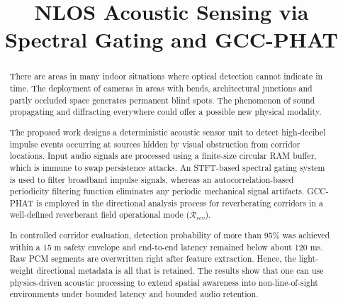 \documentclass[conference]{IEEEtran}
\begin{document}
\title{NLOS Acoustic Sensing via Spectral Gating and GCC-PHAT}

\author{
}

\maketitle

\begin{abstract}
There are areas in many indoor situations where optical detection cannot indicate in time. The deployment of cameras in areas with bends, architectural junctions and partly occluded space generates permanent blind spots. The phenomenon of sound propagating and diffracting everywhere could offer a possible new physical modality.

The proposed work designs a deterministic acoustic sensor unit to detect high-decibel impulse events occurring at sources hidden by visual obstruction from corridor locations. Input audio signals are processed using a finite-size circular RAM buffer, which is immune to swap persistence attacks. An STFT-based spectral gating system is used to filter broadband impulse signals, whereas an autocorrelation-based periodicity filtering function eliminates any periodic mechanical signal artifacts. GCC-PHAT is employed in the directional analysis process for reverberating corridors in a well-defined reverberant field operational mode ($\mathcal{R}_{rev}$).

In controlled corridor evaluation, detection probability of more than 95\% was achieved within a 15 m safety envelope and end-to-end latency remained below about 120 ms.  Raw PCM segments are overwritten right after feature extraction. Hence, the light-weight directional metadata is all that is retained. The results show that one can use physics-driven acoustic processing to extend spatial awareness into non-line-of-sight environments under bounded latency and bounded audio retention.
\end{abstract}
\end{document}
